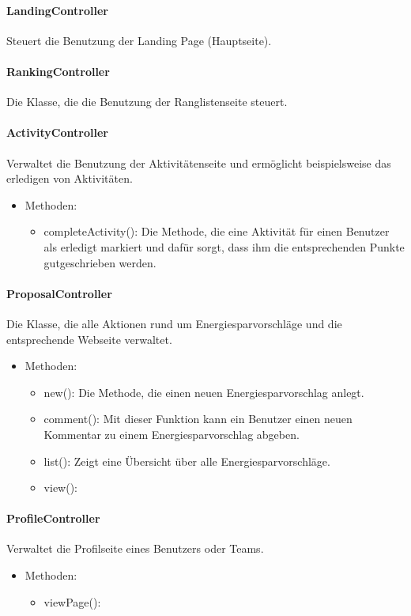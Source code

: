 	\paragraph{LandingController}Steuert die Benutzung der Landing Page (Hauptseite).
	\paragraph{RankingController}Die Klasse, die die Benutzung der Ranglistenseite steuert.
	\paragraph{ActivityController}Verwaltet die Benutzung der Aktivit\"atenseite und erm\"oglicht beispielsweise das erledigen von Aktivit\"aten.
		\begin{itemize}
			\item Methoden:
			\begin{itemize}
				\item completeActivity(): Die Methode, die eine Aktivit\"at f\"ur einen Benutzer als erledigt markiert und daf\"ur sorgt, dass ihm die entsprechenden Punkte gutgeschrieben werden.
			\end{itemize}
		\end{itemize}
	\paragraph{ProposalController}Die Klasse, die alle Aktionen rund um Energiesparvorschl\"age und die entsprechende Webseite verwaltet.
		\begin{itemize}
			\item Methoden:
			\begin{itemize}
				\item new(): Die Methode, die einen neuen Energiesparvorschlag anlegt.
				\item comment(): Mit dieser Funktion kann ein Benutzer einen neuen Kommentar zu einem Energiesparvorschlag abgeben.
				\item list(): Zeigt eine \"Ubersicht \"uber alle Energiesparvorschl\"age.
				\item view(): %
			\end{itemize}
		\end{itemize}
	\paragraph{ProfileController}Verwaltet die Profilseite eines Benutzers oder Teams.
		\begin{itemize}
			\item Methoden:
			\begin{itemize}
				\item viewPage(): %
			\end{itemize}
		\end{itemize}
